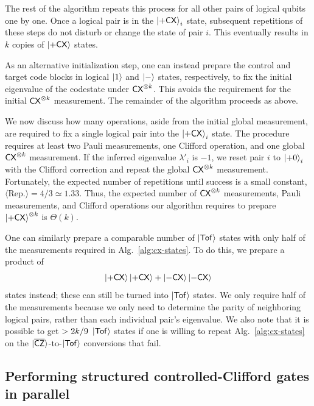 \documentclass[11pt]{article}
\begin{document}
The rest of the algorithm repeats this process for all other pairs of logical qubits one by one. Once a logical pair is in the $\ket{+\mathsf{CX}}_i$ state, subsequent repetitions of these steps do not disturb or change the state of pair $i$. This eventually results in $k$ copies of $\ket{+\mathsf{CX}}$ states. 

As an alternative initialization step, one can instead prepare the control and target code blocks in logical $\ket{1}$ and $\ket{-}$ states, respectively, to fix the initial eigenvalue of the codestate under $\mathsf{CX}^{\otimes k}$. This avoids the requirement for the initial $\mathsf{CX}^{\otimes k}$ measurement. The remainder of the algorithm proceeds as above.  

We now discuss how many operations, aside from the initial global measurement, are required to fix a single logical pair into the $\ket{+\mathsf{CX}}_i$ state. 
The procedure requires at least two Pauli measurements, one Clifford operation, and one global $\mathsf{CX}^{\otimes k}$ measurement. 
If the inferred eigenvalue $\lambda'_i$ is $-1$, we reset pair $i$ to $\ket{+0}_i$ with the Clifford correction and repeat the global $\mathsf{CX}^{\otimes k}$ measurement.
Fortunately, the expected number of repetitions until success is a small constant, $\langle \mathrm{Rep.}\rangle=4/3\simeq 1.33$. 
Thus, the expected number of $\mathsf{CX}^{\otimes k}$ measurements, Pauli measurements, and Clifford operations our algorithm requires to prepare $\ket{+\mathsf{CX}}^{\otimes k}$ is $\Theta(k)$.



One can similarly prepare a comparable number of $\ket{\mathsf{Tof}}$ states with only half of the measurements required in Alg.~\ref{alg:cx-states}. 
To do this, we prepare a product of $$\ket{+\mathsf{CX}}\ket{+\mathsf{CX}}+\ket{-\mathsf{CX}}\ket{-\mathsf{CX}}$$ states instead; these can still be turned into $\ket{\mathsf{Tof}}$ states. We only require half of the measurements because we only need to determine the parity of neighboring logical pairs, rather than each individual pair's eigenvalue. We also note that it is possible to get $> 2k/9\ \tof$ states if one is willing to repeat Alg.~\ref{alg:cx-states} on the $\ket{\overline{\mathsf{CZ}}}$-to-$\ket{\mathsf{Tof}}$ conversions that fail.



\subsection{Performing structured controlled-Clifford gates in parallel}
\label{sec:ctrl-t-gadget}
\end{document}
